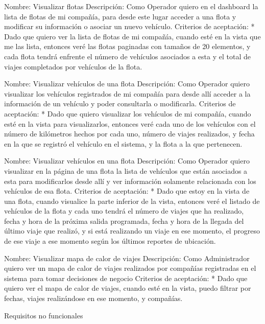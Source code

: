\documentclass{article}
\begin{document}
Nombre: Visualizar flotas
Descripción: Como Operador quiero en el dashboard la lista de flotas de mi compañía, para desde este lugar acceder a una flota y modificar su información o asociar un nuevo vehículo.
Criterios de aceptación:
* Dado que quiero ver la lista de flotas de mi compañía, cuando esté en la vista que me las lista, entonces veré las flotas paginadas con tamaños de 20 elementos, y cada flota tendrá enfrente el número de vehículos asociados a esta y el total de viajes completados por vehículos de la flota. 

Nombre: Visualizar vehículos de una flota
Descripción: Como Operador quiero visualizar los vehículos registrados de mi compañía para desde allí acceder a la información de un vehículo y poder consultarla o modificarla.
Criterios de aceptación:
* Dado que quiero visualizar los vehículos de mi compañía, cuando esté en la vista para visualizarlos, entonces veré cada uno de los vehículos con el número de kilómetros hechos por cada uno, número de viajes realizados, y fecha en la que se registró el vehículo en el sistema, y la flota a la que pertenecen.

Nombre: Visualizar vehículos en una flota
Descripción: Como Operador quiero visualizar en la página de una flota la lista de vehículos que están asociados a esta para modificarlos desde allí y ver información solamente relacionada con los vehículos de esa flota.  
Criterios de aceptación:
* Dado que estoy en la vista de una flota, cuando visualice la parte inferior de la vista, entonces veré el listado de vehículos de la flota y cada uno tendrá el número de viajes que ha realizado, fecha y hora de la próxima salida programada, fecha y hora de la llegada del último viaje que realizó, y si está realizando un viaje en ese momento, el progreso de ese viaje a ese momento según los últimos reportes de ubicación.

Nombre: Visualizar mapa de calor de viajes
Descripción: Como Administrador quiero ver un mapa de calor de viajes realizados por compañías registradas en el sistema para tomar decisiones de negocio
Criterios de aceptación: 
* Dado que quiero ver el mapa de calor de viajes, cuando esté en la vista, puedo filtrar por fechas, viajes realizándose en ese momento, y compañías.



Requisitos no funcionales
\end{document}
